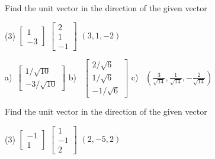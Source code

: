 \begin{exercise}
Find the unit vector in the direction of the given vector
\begin{tasks}(3)
\task
$\begin{bmatrix}
1 \\
-3 
\end{bmatrix}
$
\task
$\begin{bmatrix}
2 \\
1 \\
-1
\end{bmatrix}
$
\task
$(3,1,-2)$
\end{tasks}
\end{exercise}
\comboSol{%
}
{%
a)~$\left[\begin{smallmatrix} 1/\sqrt{10} \\ -3/\sqrt{10} \end{smallmatrix}\right]$ \quad b)~ $\left[\begin{smallmatrix} 2/\sqrt{6} \\ 1/\sqrt{6} \\ -1/\sqrt{6} \end{smallmatrix}\right]$ \quad c)~ $\left( \frac{3}{\sqrt{14}}, \frac{1}{\sqrt{14}}, -\frac{2}{\sqrt{14}}\right)$
}

\begin{exercise}\ansMark%
Find the unit vector in the direction of the given vector
\begin{tasks}(3)
\task
$\begin{bmatrix}
-1 \\
1 
\end{bmatrix}
$
\task
$\begin{bmatrix}
1 \\
-1 \\
2
\end{bmatrix}
$
\task
$(2,-5,2)$
\end{tasks}
\end{exercise}

